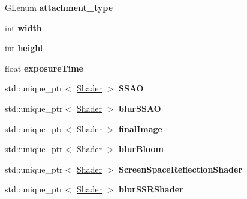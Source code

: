 \begin{DoxyCompactItemize}
\item 
G\+Lenum {\bfseries attachment\+\_\+type}\hypertarget{class_post_process_a123c0e3124940ba8aadc0abbe96f474c}{}\label{class_post_process_a123c0e3124940ba8aadc0abbe96f474c}

\item 
int {\bfseries width}\hypertarget{class_post_process_a65b8eb5b5bd81fd7cad569919a2559a3}{}\label{class_post_process_a65b8eb5b5bd81fd7cad569919a2559a3}

\item 
int {\bfseries height}\hypertarget{class_post_process_a01b97fc45027e3395f825daaa28109ef}{}\label{class_post_process_a01b97fc45027e3395f825daaa28109ef}

\item 
float {\bfseries exposure\+Time}\hypertarget{class_post_process_a6e872522e3576bae1b1edb6d02cf142c}{}\label{class_post_process_a6e872522e3576bae1b1edb6d02cf142c}

\item 
std\+::unique\+\_\+ptr$<$ \hyperlink{class_shader}{Shader} $>$ {\bfseries S\+S\+AO}\hypertarget{class_post_process_a5280896a590a2ba6ef6d3a400ed17f58}{}\label{class_post_process_a5280896a590a2ba6ef6d3a400ed17f58}

\item 
std\+::unique\+\_\+ptr$<$ \hyperlink{class_shader}{Shader} $>$ {\bfseries blur\+S\+S\+AO}\hypertarget{class_post_process_a80ad5cbd99ec98700781d49d3fb67362}{}\label{class_post_process_a80ad5cbd99ec98700781d49d3fb67362}

\item 
std\+::unique\+\_\+ptr$<$ \hyperlink{class_shader}{Shader} $>$ {\bfseries final\+Image}\hypertarget{class_post_process_afc5a961181ff7dd661270b5dbeb85ffc}{}\label{class_post_process_afc5a961181ff7dd661270b5dbeb85ffc}

\item 
std\+::unique\+\_\+ptr$<$ \hyperlink{class_shader}{Shader} $>$ {\bfseries blur\+Bloom}\hypertarget{class_post_process_a3486a820d3968491addd62096866a13e}{}\label{class_post_process_a3486a820d3968491addd62096866a13e}

\item 
std\+::unique\+\_\+ptr$<$ \hyperlink{class_shader}{Shader} $>$ {\bfseries Screen\+Space\+Reflection\+Shader}\hypertarget{class_post_process_a3899e326c875d37d35c898c46a25bafc}{}\label{class_post_process_a3899e326c875d37d35c898c46a25bafc}

\item 
std\+::unique\+\_\+ptr$<$ \hyperlink{class_shader}{Shader} $>$ {\bfseries blur\+S\+S\+R\+Shader}\hypertarget{class_post_process_a9a0346ac281251e3a7ab25592dbb5066}{}\label{class_post_process_a9a0346ac281251e3a7ab25592dbb5066}


\end{DoxyCompactItemize}
